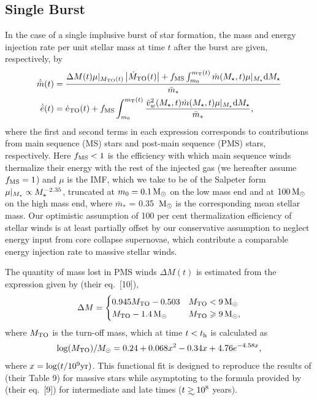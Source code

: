 
\subsection{Single Burst}

In the case of a single implusive burst of star formation, the mass
and energy injection rate per unit stellar mass at time $t$ after the
burst are given, respectively, by
\begin{align} 
  \dot{\bar{m}}(t) &= \frac{\Delta M(t) \mu|_{M_{\rm TO}(t)}
    \left|\dot{M}_{\rm TO}(t)\right| + f_{\rm MS} \int_{m_0}^{m_{\rm
        T}(t)}
    \dot{m}(M_{\star}, t) \mu|_{M_{\star}} {\rm d}M_{\star} }{\bar{m}_*}\\
  \dot{\bar{e}}(t) &=\dot{e}_{\rm TO}(t)+ f_{\rm MS} \int_{m_0}^{m_{\rm T}(t)}
  \frac{\tilde{v}_{w}^2(M_{\star}, t) \dot{m}(M_{\star}, t) \mu|_{M_{\star}} {\rm d}M_{\star}}{\bar{m}_*},
  \label{eq:edotImp}
\end{align} 
where the first and second terms in each expression corresponds to
contributions from main sequence (MS) stars and post-main sequence
(PMS) stars, respectively.  Here $ f_{\rm MS} < 1$ is the efficiency
with which main sequence winds thermalize their energy with the rest
of the injected gas (we hereafter assume $f_{\rm MS} = 1$) and $\mu$
is the IMF, which we take to be of the Salpeter form $\mu|_{M_{\star}}
\propto M_{\star}^{-2.35}$, truncated at $m_0 = 0.1 \,{\rm M_\odot}$ on the low
mass end and at $100 \,{\rm M_\odot}$ on the high mass end, where $\bar{m}_*$ =
0.35 $\,{\rm M_\odot}$ is the corresponding mean stellar mass.  Our optimistic
assumption of 100 per cent thermalization efficiency of stellar winds
is at least partially offset by our conservative assumption to neglect
energy input from core collapse supernovae, which contribute a
comparable energy injection rate to massive stellar winds.

The quantity of mass lost in PMS winds $\Delta M(t)$ is estimated from
the expression given by \citet{CiottiOstriker:2007a} (their eq.~[10]),
\begin{align}
\Delta M=
\begin{cases}
0.945 M_{\rm TO}-0.503 & M_{\rm TO} < 9 \,{\rm M_\odot}\\
 M_{\rm TO}-1.4 \,{\rm M_\odot} &  M_{\rm TO} \geqslant 9 \,{\rm M_\odot},
\end{cases}
\end{align}
where $M_{\rm TO}$ is the turn-off mass, which at time $t < t_{\rm h}$ is calculated as
\begin{align}
\log(M_{\rm TO})/M_{\odot} =0.24 + 0.068 x^2-0.34 x+4.76 e^{-4.58 x},
\end{align}
where $x=\log(t/10^9 {\rm yr})$.  This functional fit is designed
to reproduce the results of \citet{MaederMeynet:1987a} (their Table 9)
for massive stars while asymptoting to the formula provided by
\citet{CiottiOstriker:2007a} (their eq.~[9]) for intermediate and late
times ($t \gsim 10^8$ years).

